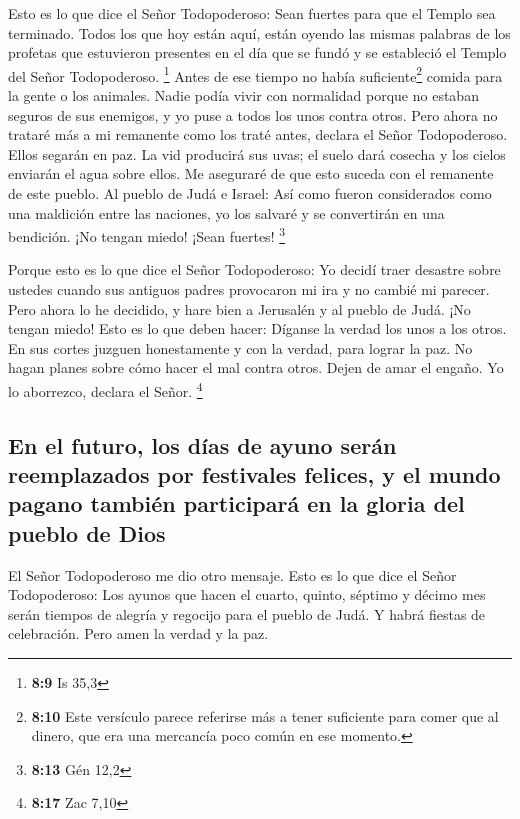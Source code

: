  Esto es lo que dice el Señor Todopoderoso: Sean fuertes
para que el Templo sea terminado. Todos los que hoy están aquí, están
oyendo las mismas palabras de los profetas que estuvieron presentes en
el día que se fundó y se estableció el Templo del Señor Todopoderoso.
\footnote{\textbf{8:9} Is 35,3}  Antes de ese tiempo no
había suficiente\footnote{\textbf{8:10} Este versículo parece referirse
  más a tener suficiente para comer que al dinero, que era una mercancía
  poco común en ese momento.} comida para la gente o los animales. Nadie
podía vivir con normalidad porque no estaban seguros de sus enemigos, y
yo puse a todos los unos contra otros.  Pero ahora no
trataré más a mi remanente como los traté antes, declara el Señor
Todopoderoso.  Ellos segarán en paz. La vid producirá sus
uvas; el suelo dará cosecha y los cielos enviarán el agua sobre ellos.
Me aseguraré de que esto suceda con el remanente de este pueblo.
 Al pueblo de Judá e Israel: Así como fueron considerados
como una maldición entre las naciones, yo los salvaré y se convertirán
en una bendición. ¡No tengan miedo! ¡Sean fuertes! \footnote{\textbf{8:13}
  Gén 12,2}

 Porque esto es lo que dice el Señor Todopoderoso: Yo
decidí traer desastre sobre ustedes cuando sus antiguos padres
provocaron mi ira y no cambié mi parecer.  Pero ahora lo
he decidido, y hare bien a Jerusalén y al pueblo de Judá. ¡No tengan
miedo!  Esto es lo que deben hacer: Díganse la verdad los
unos a los otros. En sus cortes juzguen honestamente y con la verdad,
para lograr la paz.  No hagan planes sobre cómo hacer el
mal contra otros. Dejen de amar el engaño. Yo lo aborrezco, declara el
Señor. \footnote{\textbf{8:17} Zac 7,10}

\hypertarget{en-el-futuro-los-duxedas-de-ayuno-seruxe1n-reemplazados-por-festivales-felices-y-el-mundo-pagano-tambiuxe9n-participaruxe1-en-la-gloria-del-pueblo-de-dios}{%
\subsection{En el futuro, los días de ayuno serán reemplazados por
festivales felices, y el mundo pagano también participará en la gloria
del pueblo de
Dios}\label{en-el-futuro-los-duxedas-de-ayuno-seruxe1n-reemplazados-por-festivales-felices-y-el-mundo-pagano-tambiuxe9n-participaruxe1-en-la-gloria-del-pueblo-de-dios}}

 El Señor Todopoderoso me dio otro mensaje.
 Esto es lo que dice el Señor Todopoderoso: Los ayunos
que hacen el cuarto, quinto, séptimo y décimo mes serán tiempos de
alegría y regocijo para el pueblo de Judá. Y habrá fiestas de
celebración. Pero amen la verdad y la paz.

